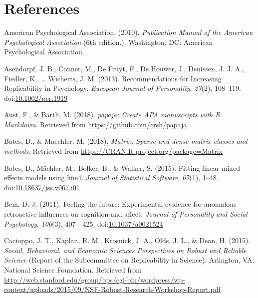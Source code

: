 \documentclass[man,floatsintext]{apa6}
\theoremstyle{definition}
\theoremstyle{definition}
\theoremstyle{definition}
\theoremstyle{remark}
\begin{document}
\newpage

\section{References}\label{references}

\begingroup
\setlength{\parindent}{-0.5in} \setlength{\leftskip}{0.5in}

\hypertarget{refs}{}
\hypertarget{ref-american_psychological_association_publication_2010}{}
American Psychological Association. (2010). \emph{Publication Manual of
the American Psychological Association} (6th edition.). Washington, DC:
American Psychological Association.

\hypertarget{ref-asendorpf_recommendations_2013}{}
Asendorpf, J. B., Conner, M., De Fruyt, F., De Houwer, J., Denissen, J.
J. A., Fiedler, K., \ldots{} Wicherts, J. M. (2013). Recommendations for
Increasing Replicability in Psychology. \emph{European Journal of
Personality}, \emph{27}(2), 108--119.
doi:\href{https://doi.org/10.1002/per.1919}{10.1002/per.1919}

\hypertarget{ref-R-papaja}{}
Aust, F., \& Barth, M. (2018). \emph{papaja: Create APA manuscripts with
R Markdown}. Retrieved from \url{https://github.com/crsh/papaja}

\hypertarget{ref-R-Matrix}{}
Bates, D., \& Maechler, M. (2018). \emph{Matrix: Sparse and dense matrix
classes and methods}. Retrieved from
\url{https://CRAN.R-project.org/package=Matrix}

\hypertarget{ref-R-lme4}{}
Bates, D., Mächler, M., Bolker, B., \& Walker, S. (2015). Fitting linear
mixed-effects models using lme4. \emph{Journal of Statistical Software},
\emph{67}(1), 1--48.
doi:\href{https://doi.org/10.18637/jss.v067.i01}{10.18637/jss.v067.i01}

\hypertarget{ref-bem_2011}{}
Bem, D. J. (2011). Feeling the future: Experimental evidence for
anomalous retroactive influences on cognition and affect. \emph{Journal
of Personality and Social Psychology}, \emph{100}(3), 407---425.
doi:\href{https://doi.org/10.1037/a0021524}{10.1037/a0021524}

\hypertarget{ref-cacioppo_social_2015}{}
Cacioppo, J. T., Kaplan, R. M., Krosnick, J. A., Olds, J. L., \& Dean,
H. (2015). \emph{Social, Behavioral, and Economic Sciences Perspectives
on Robust and Reliable Science} (Report of the Subcommittee on
Replicability in Science). Arlington, VA: National Science Foundation.
Retrieved from
\url{http://web.stanford.edu/group/bps/cgi-bin/wordpress/wp-content/uploads/2015/09/NSF-Robust-Research-Workshop-Report.pdf}
\end{document}
